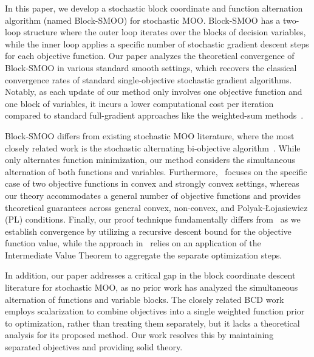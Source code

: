 \documentclass[11pt,a4paper]{article}
\numberwithin{equation}{section}%
\renewcommand{\(}{\left (}
\renewcommand{\)}{\right )}
\begin{document}
In this paper, we develop a stochastic block coordinate and function alternation algorithm (named Block-SMOO) for stochastic MOO. Block-SMOO has a two-loop structure where the outer loop iterates over the blocks of decision variables, while the inner loop applies a specific number of stochastic gradient descent steps for each objective function.
Our paper analyzes the theoretical convergence of Block-SMOO in various standard smooth settings, which recovers the classical convergence rates of standard single-objective stochastic gradient algorithms. Notably, as each update of our method only involves one objective function and one block of variables, it incurs a lower computational cost per iteration compared to standard full-gradient approaches like the weighted-sum methods~\cite{SGass_TSaaty_1955,SLiu_LNVicente_2019}. 

Block-SMOO differs from existing stochastic MOO literature, where the most closely related work is the stochastic alternating bi-objective algorithm~\cite{SLiu_LNVicente_2023}. While~\cite{SLiu_LNVicente_2023} only alternates function minimization, our method considers the simultaneous alternation of both functions and variables. Furthermore,~\cite{SLiu_LNVicente_2023} focuses on the specific case of two objective functions in convex and strongly convex settings, whereas our theory accommodates a general number of objective functions and provides theoretical guarantees across general convex, non-convex, and Polyak-Łojasiewicz (PL) conditions. Finally, our proof technique fundamentally differs from~\cite{SLiu_LNVicente_2023} as we establish convergence by utilizing a recursive descent bound for the objective function value, while the approach in~\cite{SLiu_LNVicente_2023} relies on an application of the Intermediate Value Theorem to aggregate the separate optimization steps.


In addition, our paper addresses a critical gap in the block coordinate descent literature for stochastic MOO, as no prior work has analyzed the simultaneous alternation of functions and variable blocks. The closely related BCD work~\cite{PCheng_etal_2024} employs scalarization to combine objectives into a single weighted function prior to optimization, rather than treating them separately, but it lacks a theoretical analysis for its proposed method. Our work resolves this by maintaining separated objectives and providing solid theory.
\end{document}

